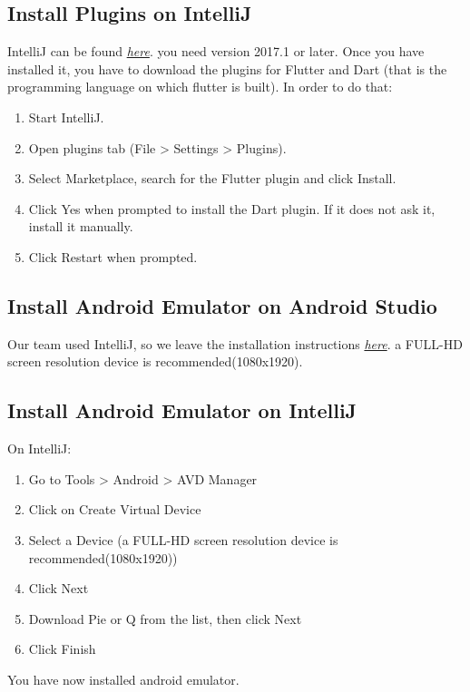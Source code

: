 \documentclass[../RASD.tex]{subfiles}
\begin{document}
\subsection{Install Plugins on IntelliJ}\label{subsec:install-plugins-on-intellij}
    IntelliJ can be found \href{https://www.jetbrains.com/idea/download/}{\textit{here}}.
    you need version 2017.1 or later.
    Once you have installed it, you have to download the plugins for Flutter and Dart (that is the programming language on which flutter is built).
    In order to do that:
    \begin{enumerate}
        \item Start IntelliJ.
        \item Open plugins tab (File > Settings > Plugins).
        \item Select Marketplace, search for the Flutter plugin and click Install.
        \item Click Yes when prompted to install the Dart plugin.
        If it does not ask it, install it manually.
        \item Click Restart when prompted.
    \end{enumerate}
\subsection{Install Android Emulator on Android Studio}\label{subsec:install-android-emulator-on-android-studio}
    Our team used IntelliJ, so we leave the installation instructions
    \href{https://docs.expo.io/versions/latest/workflow/android-studio-emulator/}{\textit{here}}.
    a FULL-HD screen resolution device is recommended(1080x1920).
\subsection{Install Android Emulator on IntelliJ}\label{subsec:install-android-emulator-on-intellij}
    On IntelliJ:
    \begin{enumerate}
        \item Go to Tools > Android > AVD Manager
        \item Click on Create Virtual Device
        \item Select a Device (a FULL-HD screen resolution device is recommended(1080x1920))
        \item Click Next
        \item Download Pie or Q from the list, then click Next
        \item Click Finish
    \end{enumerate}
    You have now installed android emulator.
\end{document}
